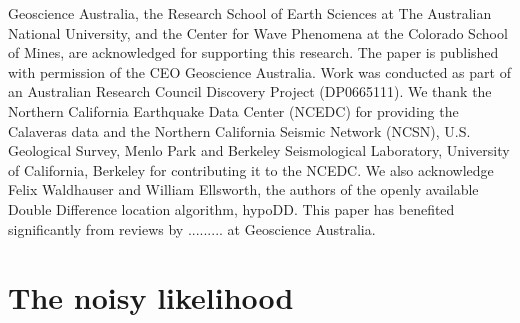 \documentclass[extra]{gji}
\begin{document}
\begin{acknowledgments}
Geoscience Australia, the Research School of Earth Sciences at The
Australian National University, and the Center for Wave Phenomena at
the Colorado School of Mines, are acknowledged for supporting this
research. The paper is published with permission of the CEO
Geoscience Australia. Work was conducted as part of an Australian
Research Council Discovery Project (DP0665111). We thank the
Northern California Earthquake Data Center (NCEDC) for providing the
Calaveras data and the Northern California Seismic Network (NCSN),
U.S. Geological Survey, Menlo Park and Berkeley Seismological
Laboratory, University of California, Berkeley for contributing it
to the NCEDC. We also acknowledge Felix Waldhauser and William
Ellsworth, the authors of the openly available Double Difference
location algorithm, hypoDD. This paper has benefited significantly
from reviews by ......... at Geoscience Australia.
\end{acknowledgments}







\appendix

\section{The noisy likelihood}
\label{sec-Appendix-noisylikelihood}
\end{document}
